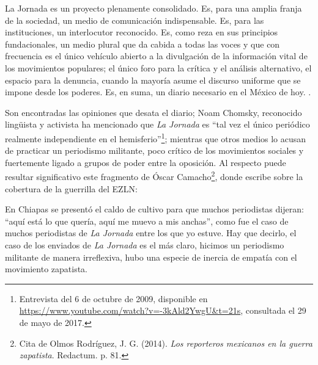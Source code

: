 \documentclass[letterpaper, 11pt]{book}
\theoremstyle{definition}
\theoremstyle{remark}
\begin{document}
\begin{center}
    \begin{minipage}{0.9\linewidth}
        {\setlength{\parindent}{12pt}\small
	    La Jornada es un proyecto plenamente consolidado. 
	    Es, para una amplia franja de la sociedad, un medio de comunicación indispensable. 
	    Es, para las instituciones, un interlocutor reconocido. 
	    Es, como reza en sus principios fundacionales, un medio plural que da cabida a todas las voces y que con frecuencia es el único vehículo abierto a la divulgación de la información vital de los movimientos populares; el único foro para la crítica y el análisis alternativo, el espacio para la denuncia, cuando la mayoría asume el discurso uniforme que se impone desde los poderes. 
	    Es, en suma, un diario necesario en el México de hoy. \normalsize \citep[475--476]{2011_Tesis_LaJornada}.
        }
    \end{minipage}
\end{center}



Son encontradas las opiniones que desata el diario; Noam Chomsky, reconocido lingüista y activista ha mencionado que \emph{La Jornada} es ``tal vez el único periódico realmente independiente en el hemisferio''\footnote{
Entrevista del 6 de octubre de 2009, disponible en \url{https://www.youtube.com/watch?v=-3kAld2YwgU&t=21s}, consultada el 29 de mayo de 2017.}; mientras que otros medios lo acusan de practicar un periodismo militante, poco crítico de los movimientos sociales y fuertemente ligado a grupos de poder entre la oposición. 
Al respecto puede resultar significativo este fragmento de Óscar Camacho\footnote{Cita de Olmos Rodríguez, J. G. (2014). \emph{Los reporteros mexicanos en la guerra zapatista}. Redactum. p. 81.}, donde escribe sobre la cobertura de la guerrilla del EZLN:

\begin{center}
    \begin{minipage}{0.9\linewidth}
        {\setlength{\parindent}{12pt}\small
	    En Chiapas se presentó el caldo de cultivo para que muchos periodistas dijeran: ``aquí está lo que quería, aquí me muevo a mis anchas'', como fue el caso de muchos periodistas de \emph{La Jornada} entre los que yo estuve. Hay que decirlo, el caso de los enviados de \emph{La Jornada} es el más claro, hicimos un periodismo militante de manera irreflexiva, hubo una especie de inercia de empatía con el movimiento zapatista.
        }
    \end{minipage}
\end{center}
\end{document}
